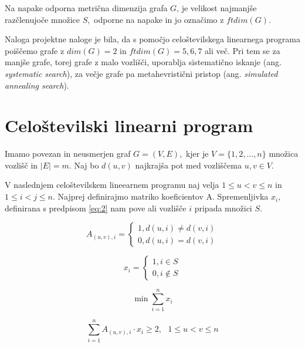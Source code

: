 \documentclass[12pt]{article}
\begin{document}
Na napake odporna metrična dimenzija grafa $G$, je velikost najmanjše razčlenujoče 
množice $S,$ odporne na napake in jo označimo z $ftdim(G).$
\vspace{0,5 cm}

Naloga projektne naloge je bila, da s pomočjo celoštevilskega linearnega programa 
poiščemo grafe z $dim(G) = 2$ in $ftdim(G) = 5, 6, 7$ ali več. Pri tem se za manjše
grafe, torej grafe z malo vozlišči, uporablja sistematično iskanje (ang.\textit{
systematic search}), za večje grafe pa metahevristični pristop (ang.\textit{ simulated 
annealing search}).

\section{Celoštevilski linearni program}

Imamo povezan in neusmerjen graf $G = (V, E),$ kjer je $V = \{1, 2, \ldots, n\}$
množica vozlišč in $\mid E \mid = m.$ Naj bo $d(u, v)$ najkrajša pot med vozliščema
$u, v \in V.$

V naslednjem celoštevilskem lineearnem programu naj velja $1 \leq u < v \leq n$ in 
$1 \leq i < j \leq n.$ Najprej definirajmo matriko koeficientov A. Spremenljivka $x_i,$ 
definirana s predpisom \eqref{eq:2} nam pove ali vozlišče $i$ pripada množici $S.$ 

\begin{equation}
    A_{(u, v), i} = \begin{cases}
        1, d(u, i) \neq d(v, i) \\
        0, d(u, i) = d(v, i)
    \end{cases}
\label{eq:1}
\end{equation}

\begin{equation}
    x_i = \begin{cases}
        1, i \in S \\
        0, i \notin S
    \end{cases}
\label{eq:2}
\end{equation} 

\begin{equation}
    \min \sum_{i = 1}^{n} x_i  
\label{eq:3}
\end{equation}

\begin{equation}
    \sum_{i = 1}^{n} A_{(u, v), i} \cdot x_i \geq 2, \text{ } 1 \leq u < v \leq n 
\label{eq:4}
\end{equation}
\end{document}
